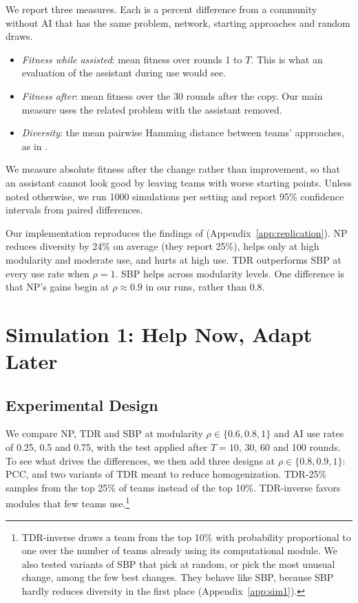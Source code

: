\documentclass[11pt]{article}
\begin{document}
We report three measures. Each is a percent difference from a community without AI that has the same problem, network, starting approaches and random draws.
\begin{itemize}
\item \emph{Fitness while assisted}: mean fitness over rounds 1 to $T$. This is what an evaluation of the assistant during use would see.
\item \emph{Fitness after}: mean fitness over the 30 rounds after the copy. Our main measure uses the related problem with the assistant removed.
\item \emph{Diversity}: the mean pairwise Hamming distance between teams' approaches, as in \citet{fazelpour2026navigating}.
\end{itemize}
We measure absolute fitness after the change rather than improvement, so that an assistant cannot look good by leaving teams with worse starting points. Unless noted otherwise, we run 1000 simulations per setting and report 95\% confidence intervals from paired differences.

Our implementation reproduces the findings of \citet{fazelpour2026navigating} (Appendix~\ref{app:replication}). NP reduces diversity by 24\% on average (they report 25\%), helps only at high modularity and moderate use, and hurts at high use. TDR outperforms SBP at every use rate when $\rho=1$. SBP helps across modularity levels. One difference is that NP's gains begin at $\rho \approx 0.9$ in our runs, rather than 0.8.

\section{Simulation 1: Help Now, Adapt Later}
\label{sec:sim1}

\subsection{Experimental Design}

We compare NP, TDR and SBP at modularity $\rho \in \{0.6, 0.8, 1\}$ and AI use rates of 0.25, 0.5 and 0.75, with the test applied after $T = 10$, 30, 60 and 100 rounds. To see what drives the differences, we then add three designs at $\rho \in \{0.8, 0.9, 1\}$: PCC, and two variants of TDR meant to reduce homogenization. TDR-25\% samples from the top 25\% of teams instead of the top 10\%. TDR-inverse favors modules that few teams use.\footnote{TDR-inverse draws a team from the top 10\% with probability proportional to one over the number of teams already using its computational module. We also tested variants of SBP that pick at random, or pick the most unusual change, among the few best changes. They behave like SBP, because SBP hardly reduces diversity in the first place (Appendix~\ref{app:sim1}).}
\end{document}
